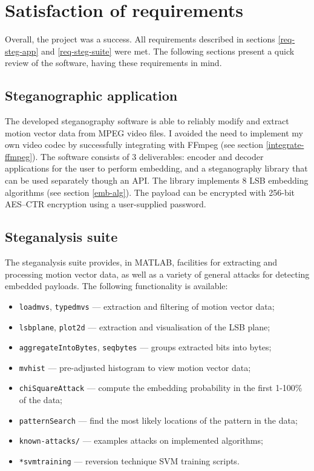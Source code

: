 \documentclass[12pt,british,twoside,notitlepage,usenames,dvipsnames,hypens,final]{report}
\numberwithin{equation}{section}
\numberwithin{figure}{section}
\begin{document}
\section{Satisfaction of requirements}

Overall, the project was a success. All requirements described in sections \ref{req-steg-app} and \ref{req-steg-suite} were met. The following sections present a quick review of the software, having these requirements in mind.

\subsection{Steganographic application}

The developed steganography software is able to reliably modify and extract motion vector data from MPEG video files. I avoided the need to implement my own video codec by successfully integrating with FFmpeg (see section \ref{integrate-ffmpeg}). The software consists of 3 deliverables: encoder and decoder applications for the user to perform embedding, and a steganography library that can be used separately though an API. The library implements 8 LSB embedding algorithms (see section \ref{emb-alg}). The payload can be encrypted with 256-bit AES--CTR encryption using a user-supplied password. 

\subsection{Steganalysis suite}

The steganalysis suite provides, in MATLAB, facilities for extracting and processing motion vector data, as well as a variety of general attacks for detecting embedded payloads. The following functionality is available:

\begin{multicols}{2}
\begin{itemize}
\item \texttt{loadmvs}, \texttt{typedmvs} --- extraction and filtering of motion vector data;
\item \texttt{lsbplane}, \texttt{plot2d} --- extraction and visualisation of the LSB plane;
\item \texttt{aggregateIntoBytes}, \texttt{seqbytes} --- groups extracted bits into bytes;
\item \texttt{mvhist} --- pre-adjusted histogram to view motion vector data;
\item \texttt{chiSquareAttack} --- compute the embedding probability in the first 1-100\% of the data;
\item \texttt{patternSearch} --- find the most likely locations of the pattern in the data;
\item \texttt{known-attacks/} --- examples attacks on implemented algorithms;
\item \texttt{*svmtraining} --- reversion technique SVM training scripts.
\end{itemize}
\end{multicols}
\end{document}
